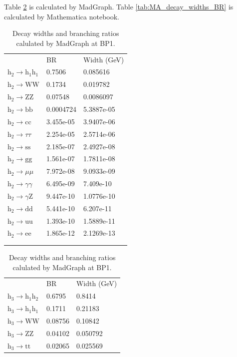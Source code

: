 \documentclass[12pt]{article}
\begin{document}
	Table \ref{tab:MG_decay_widths_BR} is calculated by MadGraph. Table \ref{tab:MA_decay_widths_BR} is calculated by Mathematica notebook.
	\begin{table}[htpb]
		\centering
		\caption{Decay widths and branching ratios calulated by MadGraph at BP1.}
		\label{tab:MG_decay_widths_BR}
		\begin{tabular}{lll}
								  & BR        & Width (GeV) \\
			$\text{h}_2\to\text{h}_1\text{h}_1$ & 0.7506    & 0.085616    \\
			$\text{h}_2\to\text{WW}$   & 0.1734    & 0.019782    \\
			$\text{h}_2\to\text{ZZ}$   & 0.07548   & 0.0086097   \\
			$\text{h}_2\to\text{bb}$   & 0.0004724 & 5.3887e-05  \\
			$\text{h}_2\to\text{cc}$   & 3.455e-05 & 3.9407e-06  \\
			$\text{h}_2\to\tau\tau$   & 2.254e-05 & 2.5714e-06  \\
			$\text{h}_2\to\text{ss}$   & 2.185e-07 & 2.4927e-08  \\
			$\text{h}_2\to\text{gg}$   & 1.561e-07 & 1.7811e-08  \\
			$\text{h}_2\to\mu\mu$   & 7.972e-08 & 9.0933e-09  \\
			$\text{h}_2\to\gamma\gamma$   & 6.495e-09 & 7.409e-10   \\
			$\text{h}_2\to\gamma\text{Z}$   & 9.447e-10 & 1.0776e-10  \\
			$\text{h}_2\to\text{dd}$   & 5.441e-10 & 6.207e-11   \\
			$\text{h}_2\to\text{uu}$   & 1.393e-10 & 1.5889e-11  \\
			$\text{h}_2\to\text{ee}$   & 1.865e-12 & 2.1269e-13  \\
			\\
			\\
		\end{tabular}	
		\begin{tabular}{lll}
								  & BR        & Width (GeV) \\
			$\text{h}_3\to\text{h}_1\text{h}_2$ & 0.6795    & 0.8414      \\
			$\text{h}_3\to\text{h}_1\text{h}_1$ & 0.1711    & 0.21183     \\
			$\text{h}_3\to\text{WW}$   & 0.08756   & 0.10842     \\
			$\text{h}_3\to\text{ZZ}$   & 0.04102   & 0.050792    \\
			$\text{h}_3\to\text{tt}$   & 0.02065   & 0.025569    \\

\end{tabular}
\end{table}
\end{document}
